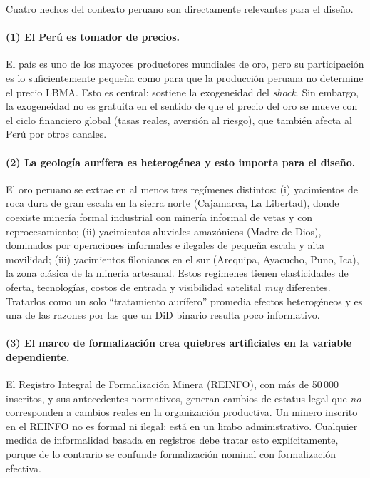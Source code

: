 \documentclass[11pt,a4paper]{article}
\begin{document}
Cuatro hechos del contexto peruano son directamente relevantes para el diseño.

\paragraph{(1) El Perú es tomador de precios.} El país es uno de los mayores productores mundiales de oro, pero su participación es lo suficientemente pequeña como para que la producción peruana no determine el precio LBMA. Esto es central: sostiene la exogeneidad del \emph{shock}. Sin embargo, la exogeneidad no es gratuita en el sentido de que el precio del oro se mueve con el ciclo financiero global (tasas reales, aversión al riesgo), que también afecta al Perú por otros canales.

\paragraph{(2) La geología aurífera es heterogénea y esto importa para el diseño.} El oro peruano se extrae en al menos tres regímenes distintos: (i) yacimientos de roca dura de gran escala en la sierra norte (Cajamarca, La Libertad), donde coexiste minería formal industrial con minería informal de vetas y con reprocesamiento; (ii) yacimientos aluviales amazónicos (Madre de Dios), dominados por operaciones informales e ilegales de pequeña escala y alta movilidad; (iii) yacimientos filonianos en el sur (Arequipa, Ayacucho, Puno, Ica), la zona clásica de la minería artesanal. Estos regímenes tienen elasticidades de oferta, tecnologías, costos de entrada y visibilidad satelital \emph{muy} diferentes. Tratarlos como un solo ``tratamiento aurífero'' promedia efectos heterogéneos y es una de las razones por las que un DiD binario resulta poco informativo.

\paragraph{(3) El marco de formalización crea quiebres artificiales en la variable dependiente.} El Registro Integral de Formalización Minera (REINFO), con más de 50\,000 inscritos, y sus antecedentes normativos, generan cambios de estatus legal que \emph{no} corresponden a cambios reales en la organización productiva. Un minero inscrito en el REINFO no es formal ni ilegal: está en un limbo administrativo. Cualquier medida de informalidad basada en registros debe tratar esto explícitamente, porque de lo contrario se confunde formalización nominal con formalización efectiva.
\end{document}
